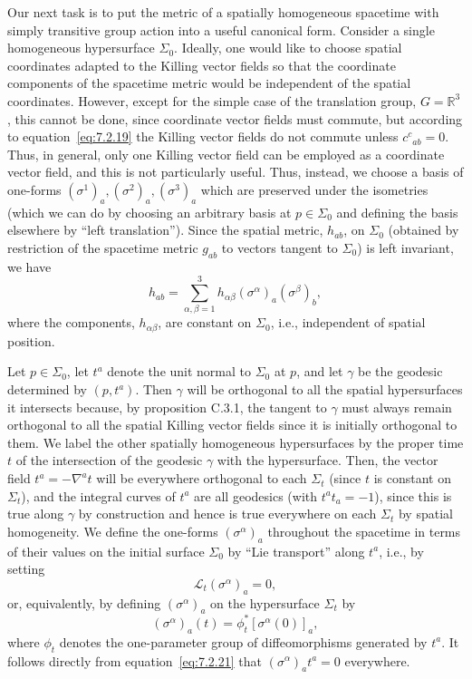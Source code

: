 Our next task is to put the metric of a spatially homogeneous spacetime with simply
transitive group action into a useful canonical form. Consider a single homogeneous
hypersurface \(\Sigma_0\). Ideally, one would like to choose spatial coordinates
adapted to the Killing vector fields so that the coordinate components of the
spacetime metric would be independent of the spatial coordinates. However, except
for the simple case of the translation group, \(G=\mathbb R^3\), this cannot be
done, since coordinate vector fields must commute, but according to
equation~\eqref{eq:7.2.19} the Killing vector fields do not commute unless
\(c^c{}_{ab}=0\). Thus, in general, only one Killing vector field can be employed
as a coordinate vector field, and this is not particularly useful. Thus, instead, we
choose a basis of one-forms
\((\sigma^1)_a,(\sigma^2)_a,(\sigma^3)_a\) which are preserved under the
isometries (which we can do by choosing an arbitrary basis at \(p\in\Sigma_0\)
and defining the basis elsewhere by “left translation”). Since the spatial metric,
\(h_{ab}\), on \(\Sigma_0\) (obtained by restriction of the spacetime metric
\(g_{ab}\) to vectors tangent to \(\Sigma_0\)) is left invariant, we have
\begin{equation}
  h_{ab}=\sum_{\alpha,\beta=1}^{3}
    h_{\alpha\beta}(\sigma^\alpha)_a(\sigma^\beta)_b ,
  \tag{7.2.20}\label{eq:7.2.20}
\end{equation}
where the components, \(h_{\alpha\beta}\), are constant on \(\Sigma_0\), i.e.,
independent of spatial position.

Let \(p\in\Sigma_0\), let \(t^a\) denote the unit normal to \(\Sigma_0\) at
\(p\), and let \(\gamma\) be the geodesic determined by \((p,t^a)\). Then
\(\gamma\) will be orthogonal to all the spatial hypersurfaces it intersects because,
by proposition C.3.1, the tangent to \(\gamma\) must always remain orthogonal to all
the spatial Killing vector fields since it is initially orthogonal to them. We label the
other spatially homogeneous hypersurfaces by the proper time \(t\) of the
intersection of the geodesic \(\gamma\) with the hypersurface. Then, the vector field
\(t^a=-\nabla^at\) will be everywhere orthogonal to each \(\Sigma_t\) (since
\(t\) is constant on \(\Sigma_t\)), and the integral curves of \(t^a\) are all
geodesics (with \(t^at_a=-1\)), since this is true along \(\gamma\) by
construction and hence is true everywhere on each \(\Sigma_t\) by spatial
homogeneity. We define the one-forms \((\sigma^\alpha)_a\) throughout the
spacetime in terms of their values on the initial surface \(\Sigma_0\) by “Lie
transport” along \(t^a\), i.e., by setting
\begin{equation}
  \mathcal L_t(\sigma^\alpha)_a=0 ,
  \tag{7.2.21}\label{eq:7.2.21}
\end{equation}
or, equivalently, by defining \((\sigma^\alpha)_a\) on the hypersurface
\(\Sigma_t\) by
\begin{equation}
  (\sigma^\alpha)_a(t)=\phi_t^*[\sigma^\alpha(0)]_a ,
  \tag{7.2.22}\label{eq:7.2.22}
\end{equation}
where \(\phi_t\) denotes the one-parameter group of diffeomorphisms generated by
\(t^a\). It follows directly from equation~\eqref{eq:7.2.21} that
\((\sigma^\alpha)_at^a=0\) everywhere.

